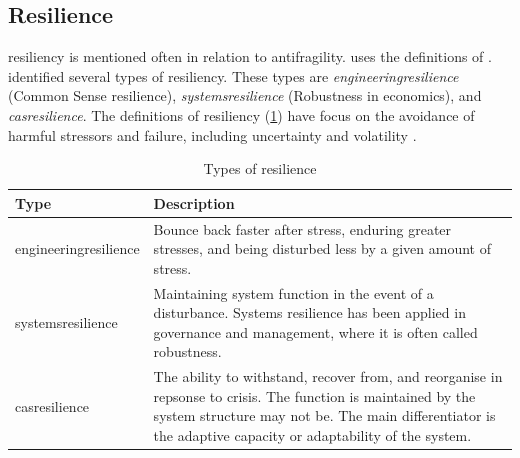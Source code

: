 \subsection{Resilience}
\label{sub:tbresilience}
\Gls{resiliency} is mentioned often in relation to \gls{antifragility}. \textcites[loc.~280]{Kastner2017}[p.~3]{Botjes2021} uses the definitions of \textcite[pp.~5--8]{MartinBreen2011}. \textcite[pp.~5--8]{MartinBreen2011} identified several types of resiliency. These types are  \textit{\gls{engineeringresilience}} (Common Sense resilience), \textit{\gls{systemsresilience}} (Robustness in economics), and \textit{\gls{casresilience}}. The definitions of \gls{resiliency} (\cref{tab:resiliencetypes}) have focus on the avoidance of harmful \glspl{stressor} and failure, including \gls{uncertainty} and \gls{volatility} \parencite[pp.~5--8]{MartinBreen2011}.
\begin{longtable}{p{}p{}}
	\toprule%
	\textbf{Type} & \textbf{Description} \\%
	\midrule%
	\endhead%
	\hline
	\endfoot%
	\caption[Types of resilience \parencite{MartinBreen2011}]{Types of resilience \parencite{MartinBreen2011}}
	\label{tab:resiliencetypes}
	\endlastfoot%
	\Gls{engineeringresilience} & Bounce back faster after stress, enduring greater stresses, and being disturbed less by a given amount of stress. \\%
	\Gls{systemsresilience} & Maintaining system function in the event of a disturbance. Systems resilience has been applied in governance and management, where it is often called robustness. \\%
	\Gls{casresilience} & The ability to withstand, recover from, and reorganise in repsonse to crisis. The function is maintained by the system structure may not be. The main differentiator is the adaptive capacity or adaptability of the system.\\%
	\bottomrule%
\end{longtable}
